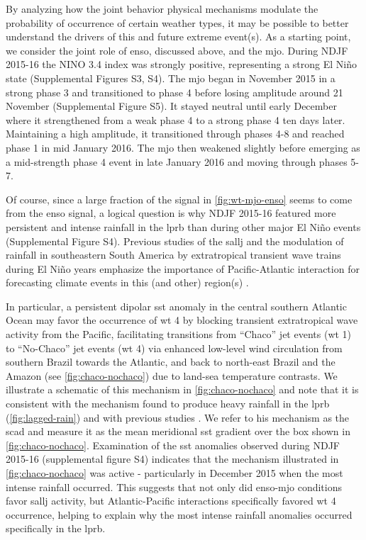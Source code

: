 \documentclass{ametsoc}
\begin{document}
By analyzing how the joint behavior physical mechanisms modulate the probability of occurrence of certain weather types, it may be possible to better understand the drivers of this and future extreme event(s).
As a starting point, we consider the joint role of \gls{enso}, discussed above, and the \gls{mjo}.
During NDJF 2015-16 the NINO 3.4 index was strongly positive, representing a strong El Ni\~{n}o state (Supplemental Figures S3, S4).
The \gls{mjo} began in November 2015 in a strong phase 3 and transitioned to phase 4 before losing amplitude around 21 November (Supplemental Figure S5).
It stayed neutral until early December where it strengthened from a weak phase 4 to a strong phase 4 ten days later.
Maintaining a high amplitude, it transitioned through phases 4-8 and reached phase 1 in mid January 2016.
The \gls{mjo} then weakened slightly before emerging as a mid-strength phase 4 event in late January 2016 and moving through phases 5-7.

Of course, since a large fraction of the signal in \cref{fig:wt-mjo-enso} seems to come from the \gls{enso} signal, a logical question is why NDJF 2015-16 featured more persistent and intense rainfall in the \gls{lprb} than during other major El Ni\~no events (Supplemental Figure S4).
Previous studies of the \gls{sallj} \citep[e.g.,][]{Vera2006} and the modulation of rainfall in southeastern South America by extratropical transient wave trains during El Ni\~no years emphasize the importance of Pacific-Atlantic interaction for forecasting climate events in this (and other) region(s) \citep{Barreiro2017}.

In particular, a persistent dipolar \gls{sst} anomaly in the central southern Atlantic Ocean may favor the occurrence of \gls{wt} 4 by blocking transient extratropical wave activity from the Pacific, facilitating transitions from ``Chaco'' jet events (\gls{wt} 1) to ``No-Chaco'' jet events (\gls{wt} 4) via enhanced low-level wind circulation from southern Brazil towards the Atlantic, and back to north-east Brazil and the Amazon (see \cref{fig:chaco-nochaco}) due to land-sea temperature contrasts.
We illustrate a schematic of this mechanism in \cref{fig:chaco-nochaco} and note that it is consistent with the mechanism found to produce heavy rainfall in the \gls{lprb} (\cref{fig:lagged-rain}) and with previous studies \citep[e.g.,][]{Salio2002,Liebmann2004,Vera2006}.
We refer to his mechanism as the \gls{scad} and measure it as the mean meridional \gls{sst} gradient over the box shown in \cref{fig:chaco-nochaco}.
Examination of the \gls{sst} anomalies observed during NDJF 2015-16 (supplemental figure S4) indicates that the mechanism illustrated in \cref{fig:chaco-nochaco} was active - particularly in December 2015 when the most intense rainfall occurred.
This suggests that not only did \gls{enso}-\gls{mjo} conditions favor \gls{sallj} activity, but Atlantic-Pacific interactions specifically favored  \gls{wt} 4 occurrence, helping to explain why the most intense rainfall anomalies occurred specifically in the \gls{lprb}.
\end{document}
